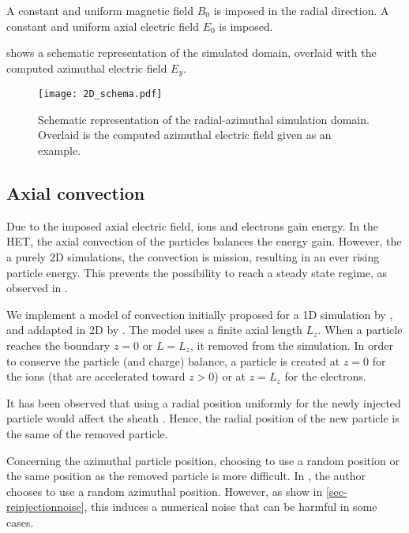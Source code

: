 A constant and uniform magnetic field $B_0$ is imposed in the radial direction.
A constant and uniform axial electric field $E_0$ is imposed.

 shows a schematic representation of the simulated domain, overlaid with the computed azimuthal electric field $E_y$.

\begin{figure}[hbtp]
  \centering
  \texttt{[image: 2D\_schema.pdf]}
  \caption{Schematic representation of the radial-azimuthal simulation domain. Overlaid is the computed azimuthal electric field given as an example. }
  \label{fig-2dschemat}
\end{figure}

\subsection{Axial convection}

Due to the imposed axial electric field, ions and electrons gain energy.
In the \ac{HET}, the axial convection of the particles balances the energy gain.
However, the a purely \ac{2D} simulations, the convection is mission, resulting in an ever rising particle energy.
This prevents the possibility to reach a steady state regime, as observed in \citet{heron2013,janhunen2018}.

We implement a model of convection initially proposed for a \ac{1D} simulation by \citet{lafleur2016a}, and addapted in \ac{2D} by \citet{croes2017a}.
The model uses a finite axial length $L_z$.
When a particle reaches the boundary $z=0$ or $L=L_z$, it removed from the simulation.
In order to conserve the particle (and charge) balance, a particle is created at $z=0$ for the ions (that are accelerated toward $z>0$) or at $z=L_z$ for the electrons.

It has been observed that using a radial position uniformly for the newly injected particle would affect the sheath \citep{croes2017a}.
Hence, the radial position of the new particle is the same of the removed particle.

Concerning the azimuthal particle position, choosing to use a random position or the same position as the removed particle is more difficult.
In \citet{lafleur2016a,croes2017a}, the author chooses to use a random azimuthal position.
However, as show in \cref{sec-reinjectionnoise}, this induces a numerical noise that can be harmful in some cases.
